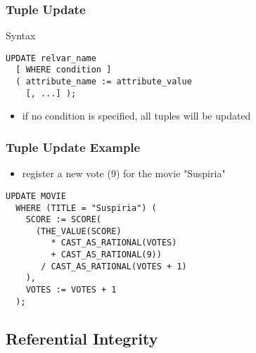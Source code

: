 \documentclass[dvipsnames]{beamer}
\theoremstyle{plain}
\begin{document}
\begin{frame}[fragile]
  \frametitle{Tuple Update}

  \begin{block}{Syntax}
    \begin{lstlisting}
UPDATE relvar_name
  [ WHERE condition ]
  ( attribute_name := attribute_value
    [, ...] );
    \end{lstlisting}
  \end{block}

  \begin{itemize}
    \item if no condition is specified, all tuples will be updated
  \end{itemize}
\end{frame}

\begin{frame}[fragile]
  \frametitle{Tuple Update Example}

  \begin{example}
    \begin{itemize}
      \item register a new vote (9) for the movie "Suspiria"
    \end{itemize}

    \begin{lstlisting}
UPDATE MOVIE
  WHERE (TITLE = "Suspiria") (
    SCORE := SCORE(
      (THE_VALUE(SCORE)
         * CAST_AS_RATIONAL(VOTES)
         + CAST_AS_RATIONAL(9))
       / CAST_AS_RATIONAL(VOTES + 1)
    ),
    VOTES := VOTES + 1
  );
    \end{lstlisting}
  \end{example}
\end{frame}

\subsection{Referential Integrity}
\end{document}
